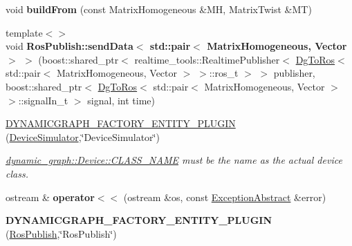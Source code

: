 \begin{DoxyCompactItemize}
\item 
void {\bfseries build\+From} (const Matrix\+Homogeneous \&MH, Matrix\+Twist \&MT)\hypertarget{namespacedynamic__graph_a8023711282c3d038a68202b12d5279d6}{}\label{namespacedynamic__graph_a8023711282c3d038a68202b12d5279d6}

\item 
{\footnotesize template$<$$>$ }\\void {\bfseries Ros\+Publish\+::send\+Data$<$ std\+::pair$<$ Matrix\+Homogeneous, Vector $>$ $>$} (boost\+::shared\+\_\+ptr$<$ realtime\+\_\+tools\+::\+Realtime\+Publisher$<$ \hyperlink{classdynamic__graph_1_1DgToRos}{Dg\+To\+Ros}$<$ std\+::pair$<$ Matrix\+Homogeneous, Vector $>$ $>$\+::ros\+\_\+t $>$ $>$ publisher, boost\+::shared\+\_\+ptr$<$ \hyperlink{classdynamic__graph_1_1DgToRos}{Dg\+To\+Ros}$<$ std\+::pair$<$ Matrix\+Homogeneous, Vector $>$ $>$\+::signal\+In\+\_\+t $>$ signal, int time)\hypertarget{namespacedynamic__graph_a3be0829bb3bf40c74c6d0e066f776902}{}\label{namespacedynamic__graph_a3be0829bb3bf40c74c6d0e066f776902}

\item 
\hyperlink{namespacedynamic__graph_a04797aa55f04bd1e07b64c0caa685c6b}{D\+Y\+N\+A\+M\+I\+C\+G\+R\+A\+P\+H\+\_\+\+F\+A\+C\+T\+O\+R\+Y\+\_\+\+E\+N\+T\+I\+T\+Y\+\_\+\+P\+L\+U\+G\+IN} (\hyperlink{classdynamic__graph_1_1DeviceSimulator}{Device\+Simulator},\char`\"{}Device\+Simulator\char`\"{})\hypertarget{namespacedynamic__graph_a04797aa55f04bd1e07b64c0caa685c6b}{}\label{namespacedynamic__graph_a04797aa55f04bd1e07b64c0caa685c6b}

\begin{DoxyCompactList}\small\item\em \hyperlink{classdynamic__graph_1_1Device_ab1612928a8cf1a9133fb2571f99095b1}{dynamic\+\_\+graph\+::\+Device\+::\+C\+L\+A\+S\+S\+\_\+\+N\+A\+ME} must be the name as the actual device class. \end{DoxyCompactList}\item 
ostream \& {\bfseries operator$<$$<$} (ostream \&os, const \hyperlink{classdynamic__graph_1_1ExceptionAbstract}{Exception\+Abstract} \&error)\hypertarget{namespacedynamic__graph_a44046716acbcd14008a1672f9bb71594}{}\label{namespacedynamic__graph_a44046716acbcd14008a1672f9bb71594}

\item 
{\bfseries D\+Y\+N\+A\+M\+I\+C\+G\+R\+A\+P\+H\+\_\+\+F\+A\+C\+T\+O\+R\+Y\+\_\+\+E\+N\+T\+I\+T\+Y\+\_\+\+P\+L\+U\+G\+IN} (\hyperlink{classdynamic__graph_1_1RosPublish}{Ros\+Publish},\char`\"{}Ros\+Publish\char`\"{})\hypertarget{namespacedynamic__graph_aa27a921d00a72d96e222688e17c81712}{}\label{namespacedynamic__graph_aa27a921d00a72d96e222688e17c81712}


\end{DoxyCompactItemize}
